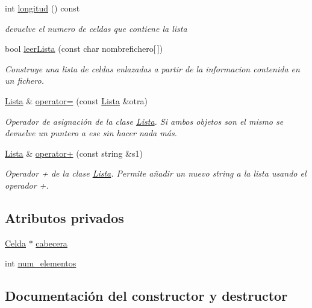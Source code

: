 \begin{DoxyCompactItemize}
int \hyperlink{class_lista_a445fbaf0a89d99ed9830ae7d0c8dd12f}{longitud} () const 
\begin{DoxyCompactList}\small\item\em devuelve el numero de celdas que contiene la lista \end{DoxyCompactList}\item 
bool \hyperlink{class_lista_aa4be655d8d5ea8e8189e7c577c86b34e}{leer\+Lista} (const char nombrefichero\mbox{[}$\,$\mbox{]})
\begin{DoxyCompactList}\small\item\em Construye una lista de celdas enlazadas a partir de la informacion contenida en un fichero. \end{DoxyCompactList}\item 
\hyperlink{class_lista}{Lista} \& \hyperlink{class_lista_a8e15d78e45d53ef28d3da4f17b245ebc}{operator=} (const \hyperlink{class_lista}{Lista} \&otra)
\begin{DoxyCompactList}\small\item\em Operador de asignación de la clase \hyperlink{class_lista}{Lista}. Si ambos objetos son el mismo se devuelve un puntero a ese sin hacer nada más. \end{DoxyCompactList}\item 
\hyperlink{class_lista}{Lista} \& \hyperlink{class_lista_a01603de447b008cdcbe72828fb7fb806}{operator+} (const string \&s1)
\begin{DoxyCompactList}\small\item\em Operador + de la clase \hyperlink{class_lista}{Lista}. Permite añadir un nuevo string a la lista usando el operador +. \end{DoxyCompactList}\end{DoxyCompactItemize}
\subsection*{Atributos privados}
\begin{DoxyCompactItemize}
\item 
\hyperlink{struct_celda}{Celda} $\ast$ \hyperlink{class_lista_a3a8e4a0637c6c328a00acc4b186f34a2}{cabecera}
\item 
int \hyperlink{class_lista_ad88ae756eb0ea2e6d3046335c5a44db8}{num\+\_\+elementos}
\end{DoxyCompactItemize}


\subsection{Documentación del constructor y destructor}
\hypertarget{class_lista_a1f668b36909182ef1360b48503529a31}{}
